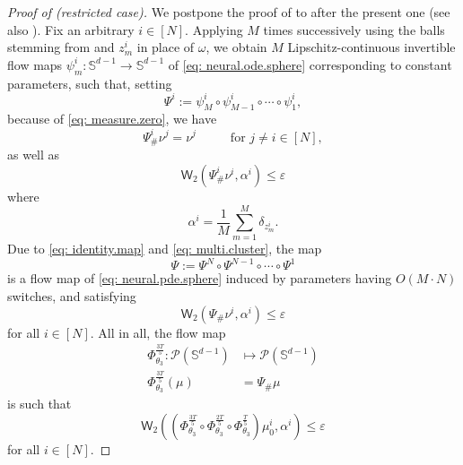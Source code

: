 \documentclass[a4paper,11pt]{article}
\theoremstyle{plain}
\renewcommand{\S}{\mathbb{S}^{d-1}}
\renewcommand{\leq}{\leqslant}
\numberwithin{equation}{section}
\begin{document}
\begin{proof}[Proof of  (restricted case)]
We postpone the proof of  to after the present one (see also ).
Fix an arbitrary $i\in[N]$. Applying  $M$ times successively using the balls stemming from  and $z_m^i$ in place of $\omega$, we obtain $M$ Lipschitz-continuous invertible flow maps $\psi_m^i:\S\to\S$ of \eqref{eq: neural.ode.sphere} corresponding to constant parameters, such that, setting
     \begin{equation*}
         \Psi^i:=\psi_M^i\circ\psi_{M-1}^i\circ\cdots \circ\psi_1^i,
     \end{equation*}
  because of \eqref{eq: measure.zero}, we have
     \begin{equation}\label{eq: identity.map}
         \Psi^i_{\#}\nu^j=\nu^j \hspace{1cm}\text{ for }j\neq i\in[N],
     \end{equation}
     as well as
     \begin{equation}\label{eq: multi.cluster}
         \mathsf{W}_2\left(\Psi^i_{\#}\nu^i,\alpha^i\right)\leq \varepsilon
     \end{equation}    
     where
     \begin{equation*}
         \alpha^i=\frac{1}{M}\sum_{m=1}^M \delta_{z_m^i}.
     \end{equation*}
     Due to \eqref{eq: identity.map} and \eqref{eq: multi.cluster}, the map
     \begin{equation*}
         \Psi:=\Psi^N\circ\Psi^{N-1}\circ\cdots\circ\Psi^1
     \end{equation*}
     is a flow map of \eqref{eq: neural.pde.sphere} induced by parameters having $O(M\cdot N)$ switches, and satisfying
     \begin{equation*}
         \mathsf{W}_2\left(\Psi_{\#}\nu^i,\alpha^i\right)\leq \varepsilon
     \end{equation*}  
     for all $i\in[N]$. All in all, the flow map
     \begin{align*}
        \Phi^{\frac{3T}{5}}_{\theta_3}:\mathscr{P}(\S)&\mapsto\mathscr{P}(\S)\\
         \Phi^{\frac{3T}{5}}_{\theta_3}(\mu)&=\Psi_\#\mu
     \end{align*}
     is such that
     \begin{equation}\label{eq: third.flow}
         \mathsf{W}_2\left(\left(\Phi^{\frac{3T}{5}}_{\theta_3}\circ \Phi^{\frac{2T}{5}}_{\theta_3}\circ\Phi^{\frac{T}{5}}_{\theta_3}\right)\mu_0^i,\alpha^i\right)\leq \varepsilon
     \end{equation}
     for all $i\in[N]$.


\end{proof}
\end{document}
